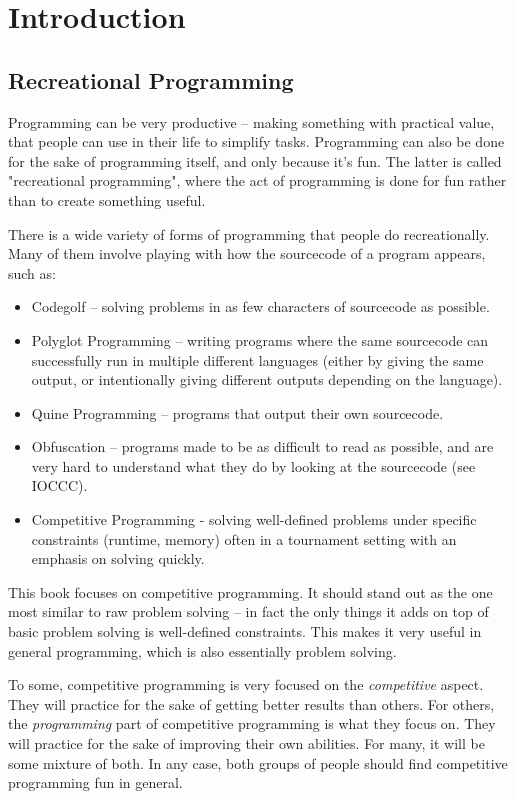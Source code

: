 \section{Introduction}
\subsection{Recreational Programming}

Programming can be very productive -- making something with practical value, that people can use in their life to simplify tasks. Programming can also be done for the sake of programming itself, and only because it's fun. The latter is called "recreational programming", where the act of programming is done for fun rather than to create something useful.

There is a wide variety of forms of programming that people do recreationally. Many of them involve playing with how the sourcecode of a program appears, such as:
\begin{itemize}
\item Codegolf -- solving problems in as few characters of sourcecode as possible.
\item Polyglot Programming -- writing programs where the same sourcecode can successfully run in multiple different languages (either by giving the same output, or intentionally giving different outputs depending on the language).
\item Quine Programming -- programs that output their own sourcecode.
\item Obfuscation -- programs made to be as difficult to read as possible, and are very hard to understand what they do by looking at the sourcecode (see IOCCC).
\item Competitive Programming - solving well-defined problems under specific constraints (runtime, memory) often in a tournament setting with an emphasis on solving quickly.
\end{itemize}

This book focuses on competitive programming. It should stand out as the one most similar to raw problem solving -- in fact the only things it adds on top of basic problem solving is well-defined constraints. This makes it very useful in general programming, which is also essentially problem solving.

To some, competitive programming is very focused on the \textit{competitive} aspect. They will practice for the sake of getting better results than others. For others, the \textit{programming} part of competitive programming is what they focus on. They will practice for the sake of improving their own abilities. For many, it will be some mixture of both. In any case, both groups of people should find competitive programming fun in general.

